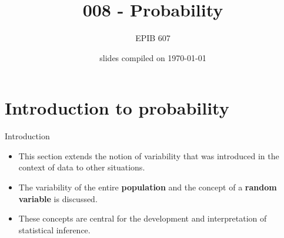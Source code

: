 \documentclass[10pt,handout]{beamer}\usepackage[]{graphicx}\usepackage[]{color}
\begin{document}

\title{008 - Probability}
\author{EPIB 607}

\date{slides compiled on \today}

\maketitle

\section{Introduction to probability}

\begin{frame}{Introduction}
	
	\begin{itemize}
		\item This section extends the notion of variability that was introduced in
		the context of data to other situations. 
		\item The variability of the entire \textbf{population} and the concept of a \textbf{random variable} is discussed. 
		\item These concepts are central for the development and interpretation of
		statistical inference. 
	\end{itemize}
	
\end{frame}
\end{document}
